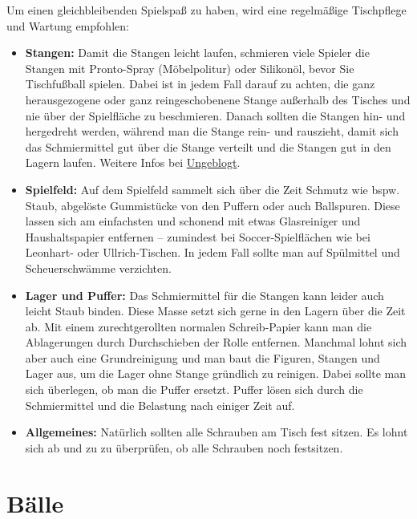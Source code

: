 Um einen gleichbleibenden Spielspaß zu haben, wird eine regelmäßige Tischpflege und Wartung empfohlen:
\begin{itemize}  
    \item {\normalfont \bfseries Stangen:} Damit die Stangen leicht laufen, schmieren viele Spieler die Stangen mit Pronto-Spray (Möbelpolitur) oder Silikonöl, bevor Sie Tischfußball spielen. Dabei ist in jedem Fall darauf zu achten, die ganz herausgezogene oder ganz reingeschobenene Stange außerhalb des Tisches und nie über der Spielfläche zu beschmieren. Danach sollten die Stangen hin- und hergedreht werden, während man die Stange rein- und rauszieht, damit sich das Schmiermittel gut über die Stange verteilt  und die Stangen gut in den Lagern laufen.
        Weitere Infos bei \href{http://ungeblogtkickern.blogspot.de/2014/11/wie-kann-ich-die-stangen-am-besten.html}{Ungeblogt}.

    \item {\normalfont \bfseries Spielfeld:} Auf dem Spielfeld sammelt sich über die Zeit Schmutz wie bspw. Staub, abgelöste Gummistücke von den Puffern oder auch Ballspuren. Diese lassen sich am einfachsten und schonend mit etwas Glasreiniger und Haushaltspapier entfernen -- zumindest bei Soccer-Spielflächen wie bei Leonhart- oder Ullrich-Tischen. In jedem Fall sollte man auf Spülmittel und Scheuerschwämme verzichten. 
    \item {\normalfont \bfseries Lager und Puffer:} Das Schmiermittel für die Stangen kann leider auch leicht Staub binden. Diese Masse setzt sich gerne in den Lagern über die Zeit ab. Mit einem zurechtgerollten normalen Schreib-Papier kann man die Ablagerungen durch Durchschieben der Rolle entfernen. Manchmal lohnt sich aber auch eine Grundreinigung und man baut die Figuren, Stangen und Lager aus, um die Lager ohne Stange gründlich zu reinigen. Dabei sollte man sich überlegen, ob man die Puffer ersetzt. Puffer lösen sich durch die Schmiermittel und die Belastung nach einiger Zeit auf.    
    \item {\normalfont \bfseries Allgemeines:} Natürlich sollten alle Schrauben am Tisch fest sitzen. Es lohnt sich ab und zu zu überprüfen, ob alle Schrauben noch festsitzen.  
\end{itemize}  


\section{Bälle}
\label{tisch:baelle}

